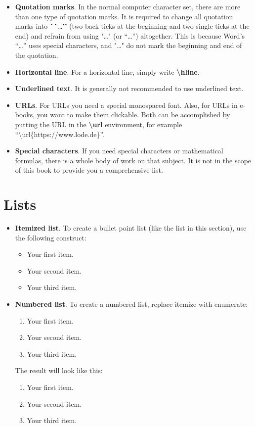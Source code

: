 \begin{itemize}
\item \textbf{Quotation marks}. In the normal computer character set, there are more than one type of quotation marks. It is required to change all quotation marks into \textbf{\`{}\`{}}\dots\textbf{\rq\rq} (two back ticks at the beginning and two single ticks at the end) and refrain from using "\dots" (or “\dots”) altogether. This is because Word's “\dots” uses special characters, and "\dots" do not mark the beginning and end of the quotation.

\item \textbf{Horizontal line}. For a horizontal line, simply write \textbf{\textbackslash hline}.

\item \textbf{Underlined text}. It is generally not recommended to use underlined text.

\item \textbf{URLs}. For URLs you need a special monospaced font. Also, for URLs in e-books, you want to make them clickable. Both can be accomplished by putting the URL in the \textbf{\textbackslash url} environment, for example ``\textbackslash url\{https://www.lode.de\}''.

\item \textbf{Special characters}. If you need special characters or mathematical formulas, there is a whole body of work on that subject. It is not in the scope of this book to provide you a comprehensive list.
\end{itemize}

\section{Lists}\label{c1_lists:sec}

\begin{itemize}

\item \textbf{Itemized list}. To create a bullet point list (like the list in this section), use the following construct:
\begin{itemize}
	\item Your first item.
	\item Your second item.
	\item Your third item.
\end{itemize}

\item \textbf{Numbered list}. To create a numbered list, replace itemize with enumerate:
\begin{enumerate}
	\item Your first item.
	\item Your second item.
	\item Your third item.
\end{enumerate}

The result will look like this:\begin{enumerate}
	\item Your first item.
	\item Your second item.
	\item Your third item.
\end{enumerate}


\end{itemize}


